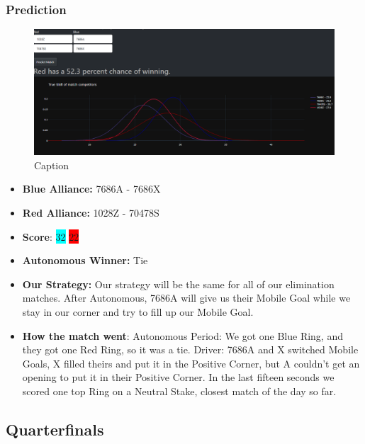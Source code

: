 \subsubsection*{Prediction}
\begin{figure}[H]
    \centering
    \includegraphics[width=0.8\linewidth]{images/R16ND.png}
    \caption{Caption}
    \label{fig:enter-label}
\end{figure}
\begin{itemize}
    \item \textbf{Blue Alliance:} 7686A - 7686X
    \item \textbf{Red Alliance:} 1028Z - 70478S
    \item \textbf{Score}: \colorbox{cyan}{32}
    \colorbox{red}{22}
    \item \textbf{Autonomous Winner:} Tie
    \item \textbf{Our Strategy:} Our strategy will be the same for all of our elimination matches. After Autonomous, 7686A will give us their Mobile Goal while we stay in our corner and try to fill up our Mobile Goal. 
    \item \textbf{How the match went}: Autonomous Period: We got one Blue Ring, and they got one Red Ring, so it was a tie. Driver: 7686A and X switched Mobile Goals, X filled theirs and put it in the Positive Corner, but A couldn't get an opening to put it in their Positive Corner. In the last fifteen seconds we scored one top Ring on a Neutral Stake, closest match of the day so far.
\end{itemize}

\subsection*{Quarterfinals}
